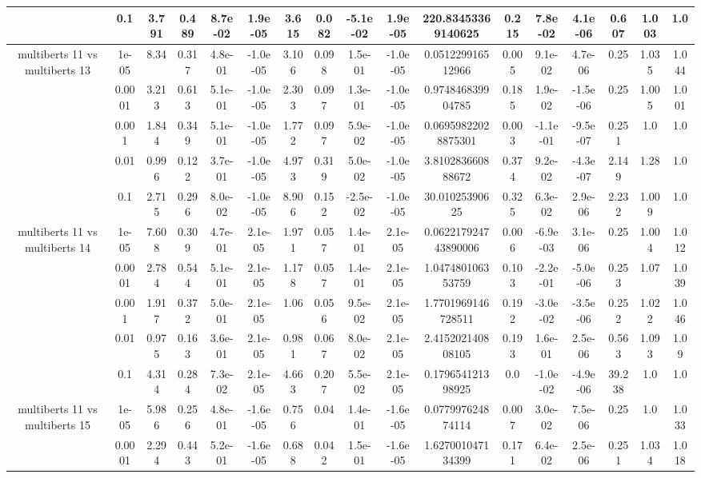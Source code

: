 \begin{tabular}{|c|c|c|c|c|c|c|c|c|c|c|c|c|c|c|c|c|}
 & 0.1 & 3.791 & 0.489 & 8.7e-02 & 1.9e-05 & 3.615 & 0.082 & -5.1e-02 & 1.9e-05 & 220.83453369140625 & 0.215 & 7.8e-02 & 4.1e-06 & 0.607 & 1.003 & 1.0 \\
\hline
\multirow{5}{*}{multiberts 11 vs multiberts 13} & 1e-05 & 8.34 & 0.317 & 4.8e-01 & -1.0e-05 & 3.106 & 0.098 & 1.5e-01 & -1.0e-05 & 0.051229916512966 & 0.005 & 9.1e-02 & 4.7e-06 & 0.25 & 1.035 & 1.044 \\
 & 0.0001 & 3.213 & 0.613 & 5.1e-01 & -1.0e-05 & 2.303 & 0.097 & 1.3e-01 & -1.0e-05 & 0.974846839904785 & 0.185 & 1.9e-02 & -1.5e-06 & 0.25 & 1.005 & 1.001 \\
 & 0.001 & 1.844 & 0.349 & 5.1e-01 & -1.0e-05 & 1.772 & 0.097 & 5.9e-02 & -1.0e-05 & 0.06959822028875301 & 0.003 & -1.1e-01 & -9.5e-07 & 0.251 & 1.0 & 1.0 \\
 & 0.01 & 0.996 & 0.122 & 3.7e-01 & -1.0e-05 & 4.973 & 0.319 & 5.0e-02 & -1.0e-05 & 3.810283660888672 & 0.374 & 9.2e-02 & -4.3e-07 & 2.149 & 1.28 & 1.0 \\
 & 0.1 & 2.715 & 0.296 & 8.0e-02 & -1.0e-05 & 8.906 & 0.152 & -2.5e-02 & -1.0e-05 & 30.01025390625 & 0.325 & 6.3e-02 & 2.9e-06 & 2.232 & 1.009 & 1.0 \\
\hline
\multirow{5}{*}{multiberts 11 vs multiberts 14} & 1e-05 & 7.608 & 0.309 & 4.7e-01 & 2.1e-05 & 1.971 & 0.057 & 1.4e-01 & 2.1e-05 & 0.062217924743890006 & 0.006 & -6.9e-03 & 3.1e-06 & 0.25 & 1.004 & 1.012 \\
 & 0.0001 & 2.784 & 0.544 & 5.1e-01 & 2.1e-05 & 1.178 & 0.057 & 1.4e-01 & 2.1e-05 & 1.047480106353759 & 0.103 & -2.2e-01 & -5.0e-06 & 0.253 & 1.07 & 1.039 \\
 & 0.001 & 1.917 & 0.372 & 5.0e-01 & 2.1e-05 & 1.06 & 0.056 & 9.5e-02 & 2.1e-05 & 1.7701969146728511 & 0.192 & -3.0e-02 & -3.5e-06 & 0.252 & 1.022 & 1.046 \\
 & 0.01 & 0.975 & 0.163 & 3.6e-01 & 2.1e-05 & 0.981 & 0.067 & 8.0e-02 & 2.1e-05 & 2.415202140808105 & 0.193 & 1.6e-01 & 2.5e-06 & 0.563 & 1.093 & 1.09 \\
 & 0.1 & 4.314 & 0.284 & 7.3e-02 & 2.1e-05 & 4.663 & 0.207 & 5.5e-02 & 2.1e-05 & 0.179654121398925 & 0.0 & -1.0e-02 & -4.9e-06 & 39.238 & 1.0 & 1.0 \\
\hline
\multirow{5}{*}{multiberts 11 vs multiberts 15} & 1e-05 & 5.986 & 0.256 & 4.8e-01 & -1.6e-05 & 0.756 & 0.04 & 1.4e-01 & -1.6e-05 & 0.077997624874114 & 0.007 & 3.0e-02 & 7.5e-06 & 0.25 & 1.0 & 1.033 \\
 & 0.0001 & 2.294 & 0.443 & 5.2e-01 & -1.6e-05 & 0.688 & 0.042 & 1.5e-01 & -1.6e-05 & 1.627001047134399 & 0.171 & 6.4e-02 & 2.5e-06 & 0.251 & 1.034 & 1.018 \\

\end{tabular}
